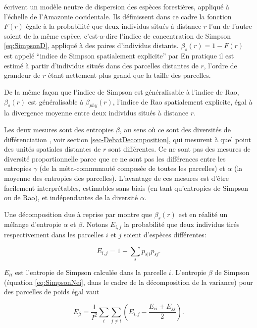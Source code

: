 \documentclass[
  11pt,
  french,
  a4paper,
  extrafontsizes,onecolumn,openright
  ]{memoir}
\begin{document}
\textcite{Chave2002} écrivent un modèle neutre de dispersion des espèces forestières, appliqué à l'échelle de l'Amazonie occidentale\autocite{Condit2002}.
Ils définissent dans ce cadre la fonction \(F(r)\) égale à la probabilité que deux individus situés à distance \(r\) l'un de l'autre soient de la même espèce, c'est-a-dire l'indice de concentration de Simpson \eqref{eq:SimpsonD}, appliqué à des paires d'individus distants.
\(\beta_s(r)=1-F(r)\) est appelé \enquote{indice de Simpson spatialement explicite} par \textcite{Shen2013}
En pratique il est estimé à partir d'individus situés dans des parcelles distantes de \(r\), l'ordre de grandeur de \(r\) étant nettement plus grand que la taille des parcelles.

De la même façon que l'indice de Simpson est généralisable à l'indice de Rao, \(\beta_s(r)\) est généralisable à \(\beta_{phy}(r)\), l'indice de Rao spatialement explicite, égal à la divergence moyenne entre deux individus situés à distance \(r\).

Les deux mesures sont des entropies \(\beta\), au sens où ce sont des diversités de différenciation \autocite{Jurasinski2009}, voir section \ref{sec-DebatDecomposition}, qui mesurent à quel point des unités spatiales distantes de \(r\) sont différentes.
Ce ne sont pas des mesures de diversité proportionnelle parce que ce ne sont pas les différences entre les entropies \(\gamma\) (de la méta-communauté composée de toutes les parcelles) et \(\alpha\) (la moyenne des entropies des parcelles).
L'avantage de ces mesures est d'être facilement interprétables, estimables sans biais (en tant qu'entropies de Simpson ou de Rao), et indépendantes de la diversité \(\alpha\).

Une décomposition due à \textcite{Nei1973} reprise par \textcite{Chave2007} montre que \(\beta_s(r)\) est en réalité un mélange d'entropie \(\alpha\) et \(\beta\).
Notons \(E_{i,j}\) la probabilité que deux individus tirés respectivement dans les parcelles \(i\) et \(j\) soient d'espèces différentes:

\begin{equation}
  \label{eq:Nei1973}
  E_{i,j} = 1-\sum_{s}{p_{s|i}}{p_{sj}}.
\end{equation}

\(E_{ii}\) est l'entropie de Simpson calculée dans la parcelle \(i\).
L'entropie \(\beta\) de Simpson (équation \eqref{eq:SimpsonNei}, dans le cadre de la décomposition de la variance) pour des parcelles de poids égal vaut

\begin{equation}
  \label{eq:EbetaNei}
  E_{\beta} = \frac{1}{I^2} \sum_{i}\sum_{j\ne i}\left({E_{i,j}-\frac{E_{ii}+E_{jj}}{2}}\right).
\end{equation}
\end{document}
